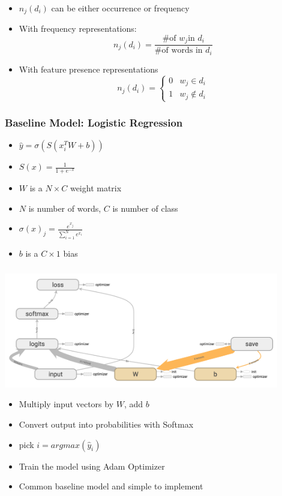 \documentclass{beamer}
\begin{document}
\begin{frame}
\frametitle{}
    \begin{itemize}
        \item $n_j(d_i)$ can be either occurrence or frequency
        \item With frequency representations:
        $$n_j(d_i) = \frac{\text{\# of }w_j \text{in } d_i}{\text{\# of words in } d_i}$$
        \item With feature presence representations
        $$n_j(d_i) = \begin{cases} 
        0 & w_j \in d_i\\
        1 & w_j \notin d_i
        \end{cases}$$
    \end{itemize}
\end{frame}

\begin{frame}
\frametitle{Baseline Model: Logistic Regression}
    \begin{itemize}
        \item $\hat{y} = \sigma(S(x^T_i W +b))$
        \item $S(x) = \frac{1}{1+e^{-x}}$
        \item $W$ is a $N \times C$ weight matrix
        \item $N$ is number of words, $C$ is number of class
        \item $\sigma (x)_{j}={\frac {e^{x_{j}}}{\sum _{i=1}^{N}e^{x_{i}}}}$
        \item $b$ is a $C \times 1$ bias
    \end{itemize}
\end{frame}

\begin{frame}
\frametitle{}
    \center\includegraphics[width=0.9\textwidth]{figure/model_architecture}
    \begin{itemize}
        \item Multiply input vectors by $W$, add $b$
        \item Convert output into probabilities with Softmax
        \item pick $i=argmax(\hat{y}_i)$
        \item Train the model using Adam Optimizer
        \item Common baseline model and simple to implement
    \end{itemize}
\end{frame}
\end{document}
